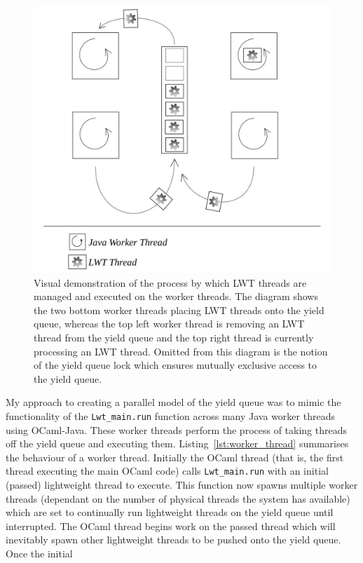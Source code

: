 \documentclass[12pt,twoside,notitlepage]{report}
\begin{document}
\begin{figure}[h!]
\includegraphics[width=\linewidth]{yield_queue}
\caption[Yield Queue Diagram]{Visual demonstration of the process by which LWT threads are managed and executed on the worker threads. The diagram shows the two bottom worker threads placing LWT threads onto the yield queue, whereas the top left worker
thread is removing an LWT thread from the yield queue and the top right thread is currently processing an LWT thread. Omitted from this diagram is the notion of the yield queue lock which ensures mutually exclusive access to the yield
queue.}
\label{fig:yield_queue}
\end{figure}
%
%
My approach to creating a parallel model of the yield queue was to mimic the functionality of the {\tt Lwt\_main.run} function across many Java worker threads using OCaml-Java. These worker threads perform the process of
taking threads off the yield queue and executing them. Listing~\ref{lst:worker_thread} summarises the behaviour of a worker thread. Initially the OCaml thread (that is, the first thread executing the main
OCaml code) calls {\tt Lwt\_main.run} with an initial (passed) lightweight thread to execute. This function now spawns multiple worker threads (dependant on the number of physical threads the system has available) which are set
to continually run lightweight threads on the yield queue until interrupted. The OCaml thread begins work on the passed thread which will inevitably spawn other lightweight threads to be pushed onto the yield queue. Once the initial
\end{document}
